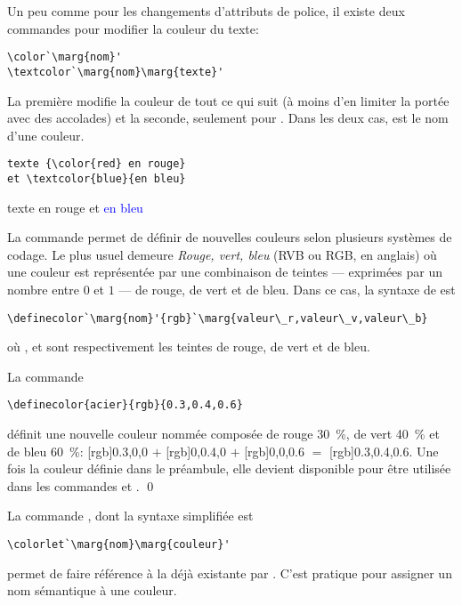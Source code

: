 Un peu comme pour les changements d'attributs de police, il existe
deux commandes pour modifier la couleur du texte:
\begin{lstlisting}
\color`\marg{nom}'
\textcolor`\marg{nom}\marg{texte}'
\end{lstlisting}
La première modifie la couleur de tout ce qui suit (à moins d'en
limiter la portée avec des accolades) et la seconde, seulement pour
. Dans les deux cas,  est le nom d'une couleur.
\begin{demo}
  \begin{texample}
\begin{lstlisting}
texte {\color{red} en rouge}
et \textcolor{blue}{en bleu}
\end{lstlisting}
  \producing
  texte {\color{red} en rouge} et \textcolor{blue}{en bleu}
  \end{texample}
\end{demo}

La commande \cmd{\definecolor} permet de définir de nouvelles couleurs
selon plusieurs systèmes de codage. Le plus usuel demeure \emph{Rouge,
  vert, bleu} (RVB ou RGB, en anglais) où une couleur est représentée
par une combinaison de teintes --- exprimées par un nombre entre $0$
et $1$ --- de rouge, de vert et de bleu. Dans ce cas, la syntaxe de
\cmd{\definecolor} est
\begin{lstlisting}
\definecolor`\marg{nom}'{rgb}`\marg{valeur\_r,valeur\_v,valeur\_b}
\end{lstlisting}
où ,  et  sont
respectivement les teintes de rouge, de vert et de bleu.

\begin{exemple}
  La commande
\begin{lstlisting}
\definecolor{acier}{rgb}{0.3,0.4,0.6}
\end{lstlisting}
  définit une nouvelle couleur nommée  composée de rouge
  30~\%, de vert 40~\% et de bleu 60~\%: %
  [rgb]{0.3,0,0}{\phantom{xx}} $+$ %
  [rgb]{0,0.4,0}{\phantom{xx}} $+$ %
  [rgb]{0,0,0.6}{\phantom{xx}} $=$ %
  [rgb]{0.3,0.4,0.6}{\phantom{xx}}. %
  Une fois la couleur   définie dans le préambule, elle
  devient disponible pour être utilisée dans les commandes
  \cmdprint{\color} et \cmdprint{\textcolor}. %
  \qed
\end{exemple}

La commande , dont la syntaxe simplifiée est
\begin{lstlisting}
\colorlet`\marg{nom}\marg{couleur}'
\end{lstlisting}
permet de faire référence à la  déjà existante par
. C'est pratique pour assigner un nom sémantique à une
couleur.



